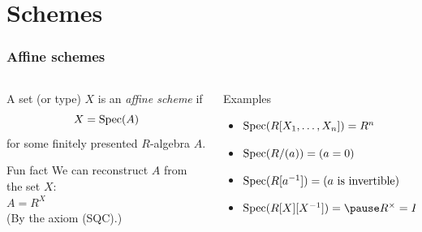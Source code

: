 \documentclass[aspectratio=1610]{beamer}
\begin{document}
\section{Schemes}

\begin{frame}
  \frametitle{Affine schemes}

  \begin{columns}
    \begin{column}{0.5\textwidth}
      \pause%
      \begin{definition}
        A set (or type) $X$ is an \emph{affine scheme} if
        \[ X = \operatorname{Spec}(A) \]
        for some finitely presented $R$-algebra $A$.
      \end{definition}

      \pause%
      \bigskip
      \begin{block}{Fun fact}
        We can reconstruct $A$ from the set $X$:\\
        $A = R^X$\\
        (By the axiom (SQC).)
      \end{block}
    \end{column}

    \pause%
    \begin{column}{0.5\textwidth}
      \begin{exampleblock}{Examples}
        \begin{itemize}
          \item
            $\operatorname{Spec}(R[X_1, \dots, X_n]) = R^n$
          \item
            $\operatorname{Spec}(R/(a)) = (a = 0)$
          \item
            $\operatorname{Spec}(R[a^{-1}]) = (\text{$a$ is invertible})$
          \pause%
          \item
            $\Spec(R[X][X^{-1}]) = \pause R^\times = R \setminus \{0\}$
        \end{itemize}
      \end{exampleblock}
    \end{column}
  \end{columns}
\end{frame}
\end{document}

